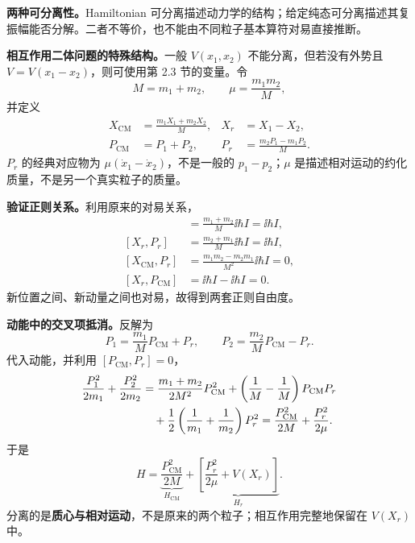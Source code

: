 \textbf{两种可分离性。}Hamiltonian 可分离描述动力学的结构；给定纯态可分离描述其复振幅能否分解。二者不等价，也不能由不同粒子基本算符对易直接推断。

\textbf{相互作用二体问题的特殊结构。}一般 $V(x_1,x_2)$ 不能分离，但若没有外势且 $V=V(x_1-x_2)$，则可使用第 2.3 节的变量。令
\begin{equation}
  M=m_1+m_2,\qquad \mu=\frac{m_1m_2}{M},
\end{equation}
并定义
\begin{align}
  X_{\mathrm{CM}}&=\frac{m_1X_1+m_2X_2}{M},
  &X_r&=X_1-X_2,\\
  P_{\mathrm{CM}}&=P_1+P_2,
  &P_r&=\frac{m_2P_1-m_1P_2}{M}.
\end{align}
$P_r$ 的经典对应物为 $\mu(\dot x_1-\dot x_2)$，不是一般的 $p_1-p_2$；$\mu$ 是描述相对运动的约化质量，不是另一个真实粒子的质量。

\textbf{验证正则关系。}利用原来的对易关系，
\begin{align}
  [X_{\mathrm{CM}},P_{\mathrm{CM}}]
    &=\frac{m_1+m_2}{M}\ii\hbar I=\ii\hbar I,\\
  [X_r,P_r]&=\frac{m_2+m_1}{M}\ii\hbar I=\ii\hbar I,\\
  [X_{\mathrm{CM}},P_r]
    &=\frac{m_1m_2-m_2m_1}{M^2}\ii\hbar I=0,\\
  [X_r,P_{\mathrm{CM}}]&=\ii\hbar I-\ii\hbar I=0.
\end{align}
新位置之间、新动量之间也对易，故得到两套正则自由度。

\textbf{动能中的交叉项抵消。}反解为
\begin{equation}
  P_1=\frac{m_1}{M}P_{\mathrm{CM}}+P_r,\qquad
  P_2=\frac{m_2}{M}P_{\mathrm{CM}}-P_r.
\end{equation}
代入动能，并利用 $[P_{\mathrm{CM}},P_r]=0$，
\begin{align}
  \frac{P_1^2}{2m_1}+\frac{P_2^2}{2m_2}
  &=\frac{m_1+m_2}{2M^2}P_{\mathrm{CM}}^2
    +\left(\frac1M-\frac1M\right)P_{\mathrm{CM}}P_r\notag\\
  &\quad+\frac12\left(\frac1{m_1}+\frac1{m_2}\right)P_r^2
   =\frac{P_{\mathrm{CM}}^2}{2M}+\frac{P_r^2}{2\mu}.
\end{align}
于是
\begin{equation}
  \boxed{H=\underbrace{\frac{P_{\mathrm{CM}}^2}{2M}}_{H_{\mathrm{CM}}}
    +\underbrace{\left[\frac{P_r^2}{2\mu}+V(X_r)\right]}_{H_r}}.
  \label{eq:QM-C10-S01-cm-separation}
\end{equation}
分离的是\textbf{质心与相对运动}，不是原来的两个粒子；相互作用完整地保留在 $V(X_r)$ 中。


